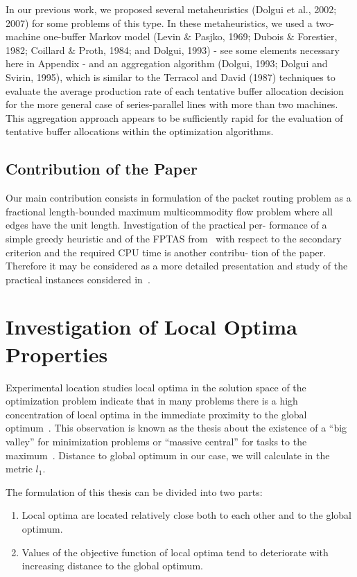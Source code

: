 \documentclass{ifacconf}
\begin{document}
In our previous work, we proposed several metaheuristics (Dolgui et al., 2002; 2007) for 
some problems of this type. In these metaheuristics, we used a two-machine one-buffer 
Markov  model  (Levin  $\&$  Pasjko,  1969;  Dubois  $\&$  Forestier,  1982;  Coillard  $\&$  Proth, 
1984;  and  Dolgui,  1993)  -  see  some  elements  necessary  here  in  Appendix  -  and  an 
aggregation algorithm (Dolgui, 1993; Dolgui and Svirin, 1995), which is similar to the 
Terracol and David (1987) techniques to evaluate the average production rate of each 
tentative buffer allocation decision for the more general case of series-parallel lines with 
more than two machines. This aggregation approach appears to be sufficiently rapid for 
the evaluation of tentative buffer allocations within the optimization algorithms. 

\subsection{Contribution of the Paper}
Our main contribution consists in formulation of the
packet routing problem as a fractional length-bounded
maximum multicommodity flow problem where all edges
have the unit length. Investigation of the practical per-
formance of a simple greedy heuristic and of the FPTAS
from~\cite{BEHTV19} with respect to the secondary
criterion and the required CPU time is another contribu-
tion of the paper. Therefore it may be considered as a more
detailed presentation and study of the practical instances
considered in~\cite{BEHTV19}.


\section{Investigation of Local Optima Properties} \label{investigation}

Experimental location studies
local optima in the solution space of the optimization problem
indicate that in many problems there is a high
concentration of local optima in the immediate
proximity to the global optimum~\cite{Reev}. This observation is known as
the thesis about the existence of a ``big valley'' for minimization problems
or ``massive central'' for tasks to the maximum~\cite{Boese,Hains}. Distance to global optimum
in our case, we will calculate in the metric $l_1$.

\noindent The formulation of this thesis can be divided into two parts:
\begin{enumerate}
\item Local optima are located relatively close both to each other and to the global optimum.\newline
\item Values of the objective function of local optima tend to deteriorate with increasing distance to the global optimum.
\end{enumerate}
\end{document}
